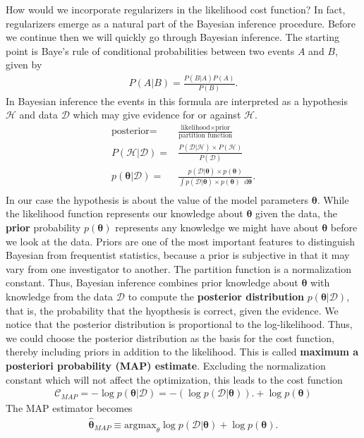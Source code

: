 \documentclass[twoside,english]{uiofysmaster}
\newcommand*\dif{\mathop{}\!\mathrm{d}}
\begin{document}
How would we incorporate regularizers in the likelihood cost function? In fact, regularizers emerge as a natural part of the Bayesian inference procedure. Before we continue then we will quickly go through Bayesian inference. 
The starting point is Baye's rule of conditional probabilities between two events $A$ and $B$, given by
\begin{align}
	P(A|B) = \frac{P(B|A) P(A)}{P(B)} .
\end{align}
In Bayesian inference the events in this formula are interpreted as a hypothesis $\mathcal{H}$ and data $\mathcal{D}$ which may give evidence for or against $\mathcal{H}$.
\begin{align}
	\text{posterior} =& \frac{\text{likelihood} \times \text{prior}}{\text{partition function}} \\
	P(\mathcal{H}|\mathcal{D}) =& \frac{P(\mathcal{D}|\mathcal{H}) \times P(\mathcal{H})}{P(\mathcal{D})} \\
	p(\bm{\theta}|\mathcal{D}) =& \frac{p(\mathcal{D}|\bm{\theta}) \times p(\bm{\theta})}
	{\int p(\mathcal{D}|\bm{\theta}) \times p(\bm{\theta}) \dif \bm{\theta} } . \\
\end{align}
In our case the hypothesis is about the value of the model parameters $\bm{\theta}$. While the likelihood function represents our knowledge about $\bm{\theta}$ given the data, the \textbf{prior} probability $p(\bm{\theta})$ represents any knowledge we might have about $\bm{\theta}$ before we look at the data. Priors are one of the most important features to distinguish Bayesian from frequentist statistics, because a prior is subjective in that it may vary from one investigator to another. The partition function is a normalization constant. Thus, Bayesian inference combines prior knowledge about $\bm{\theta}$ with knowledge from the data $\mathcal{D}$ to compute the \textbf{posterior distribution} $p(\bm{\theta}|\mathcal{D})$, that is, the probability that the hyopthesis is correct, given the evidence.
We notice that the posterior distribution is proportional to the log-likelihood. Thus, we could choose the posterior distribution as the basis for the cost function, thereby including priors in addition to the likelihood. This is called \textbf{maximum a posteriori probability (MAP) estimate}. Excluding the normalization constant which will not affect the optimization, this leads to the cost function
\begin{align}
	\mathcal{C}_{MAP} = - \log p(\bm{\theta}|\mathcal{D}) = - (\log p(\mathcal{D}|\bm{\theta})) .
	+ \log p(\bm{\theta})
\end{align}
The MAP estimator becomes
\begin{align}
	\hat{\bm{\theta}}_{MAP} \equiv \text{argmax}_\theta \log p(\mathcal{D} | \bm{\theta}) + \log p(\bm{\theta}) .
\end{align}
\end{document}
